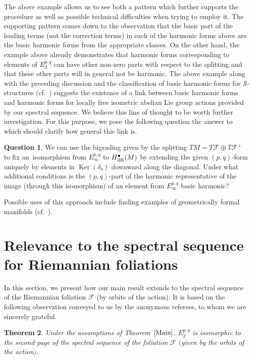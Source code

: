 \documentclass[pdftex]{sigma}
\numberwithin{equation}{section}
\newtheorem{tw}{Theorem}[section]
\theoremstyle{definition}
\newtheorem{ques}[tw]{Question}
\begin{document}
The above example allows us to see both a pattern which further supports the procedure as well as possible technical difficulties when trying to employ it. The supporting pattern comes down to the observation that the basic part of the leading terms (not the correction terms) in each of the harmonic forms above are the basic harmonic forms from the appropriate classes. On the other hand, the example above already demonstrates that harmonic forms corresponding to elements of $E^{p,q}_2$ can have other non-zero parts with respect to the splitting and that these other parts will in general not be harmonic. The above example along with the preceding discussion and the classification of basic harmonic forms for $\mathcal{S}$-structures (cf.~\cite{My2}) suggests the existence of a link between basic harmonic forms and harmonic forms for locally free isometric abelian Lie group actions provided by our spectral sequence. We believe this line of thought to be worth further investigation. For this purpose, we pose the following question the answer to which should clarify how general this link is.

\begin{ques} We can use the bigrading given by the splitting $TM=T\mathcal{F}\oplus T\mathcal{F}^{\perp}$ to fix an~isomorphism from $E^{p,q}_{\infty}$ to $H^{\bullet}_{\rm dR}(M)$ by extending the given $(p,q)$-form uniquely by elements in $\operatorname{Ker}(\delta_b)$ downward along the diagonal. Under what additional conditions is the $(p,q)$-part of the harmonic representative of the image (through this isomorphism) of an element from $E^{p,q}_{\infty}$ basic harmonic?
\end{ques}

Possible uses of this approach include finding examples of geometrically formal manifolds (cf.~\cite{H,K}).

\section{Relevance to the spectral sequence for Riemannian foliations}
In this section, we present how our main result extends to the spectral sequence of the Riemannian foliation $\mathcal{F}$ (by orbits of the action). It is based on the following observation conveyed to us by the anonymous referees, to whom we are sincerely grateful.

\begin{tw}\label{Comp} Under the assumptions of Theorem~$\ref{Main}$, $E^{p,q}_2$ is isomorphic to the second page of the spectral sequence of the foliation $\mathcal{F}$ $($given by the orbits of the action$)$.
\end{tw}
\end{document}
